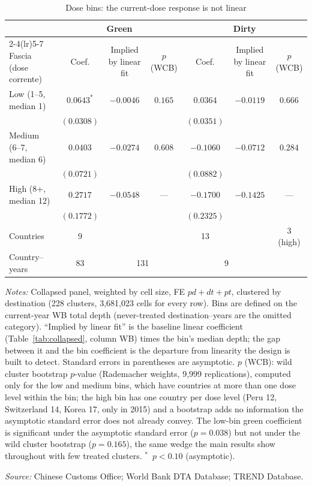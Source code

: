 \begin{table}[htbp]
\centering
\footnotesize
\caption{Dose bins: the current-dose response is not linear}
\label{tab:dosebins}
\begin{threeparttable}
\begin{tabular}{lcccccc}
\toprule
 & \multicolumn{3}{c}{Green} & \multicolumn{3}{c}{Dirty} \\
\cmidrule(lr){2-4}\cmidrule(lr){5-7}
Fascia (dose corrente) & Coef. & Implied by linear fit & $p$ (WCB) & Coef. & Implied by linear fit & $p$ (WCB) \\
\midrule
Low (1--5, median 1)   & $0.0643^{*}$  & $-0.0046$ & $0.165$ & $0.0364$    & $-0.0119$ & $0.666$ \\
                        & $(0.0308)$    &           &         & $(0.0351)$  &           &         \\[4pt]
Medium (6--7, median 6) & $0.0403$      & $-0.0274$ & $0.608$ & $-0.1060$   & $-0.0712$ & $0.284$ \\
                        & $(0.0721)$    &           &         & $(0.0882)$  &           &         \\[4pt]
High (8+, median 12)   & $0.2717$      & $-0.0548$ & --- & $-0.1700$   & $-0.1425$ & --- \\
                        & $(0.1772)$    &           &         & $(0.2325)$  &           &         \\
\midrule
Countries & 9 & & & 13 & & 3 (high) \\
Country--years & 83 & \multicolumn{2}{c}{131} & \multicolumn{2}{c}{9} & \\
\bottomrule
\end{tabular}
\begin{tablenotes}[flushleft]\footnotesize
\item \emph{Notes:} Collapsed panel, weighted by cell size, FE $pd+dt+pt$, clustered by destination (228 clusters, 3{,}681{,}023 cells for every row). Bins are defined on the current-year WB total depth (never-treated destination--years are the omitted category). ``Implied by linear fit'' is the baseline linear coefficient (Table~\ref{tab:collapsed}, column WB) times the bin's median depth; the gap between it and the bin coefficient is the departure from linearity the design is built to detect. Standard errors in parentheses are asymptotic. $p$ (WCB): wild cluster bootstrap $p$-value (Rademacher weights, 9{,}999 replications), computed only for the low and medium bins, which have countries at more than one dose level within the bin; the high bin has one country per dose level (Peru 12, Switzerland 14, Korea 17, only in 2015) and a bootstrap adds no information the asymptotic standard error does not already convey. The low-bin green coefficient is significant under the asymptotic standard error ($p=0.038$) but not under the wild cluster bootstrap ($p=0.165$), the same wedge the main results show throughout with few treated clusters. $^{*}$~$p<0.10$ (asymptotic).
\item \textit{Source:} Chinese Customs Office; World Bank DTA Database; TREND Database.
\end{tablenotes}
\end{threeparttable}
\end{table}

